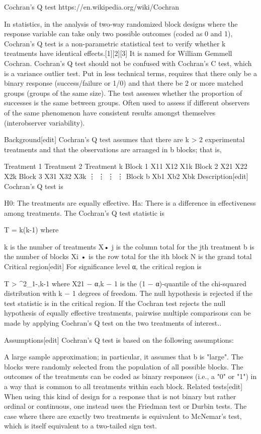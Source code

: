 Cochran's Q test
https://en.wikipedia.org/wiki/Cochran%

In statistics, in the analysis of two-way randomized block designs where the response variable can take only two possible outcomes (coded as 0 and 1), Cochran's Q test is a non-parametric statistical test to verify whether k treatments have identical effects.[1][2][3] It is named for William Gemmell Cochran. Cochran's Q test should not be confused with Cochran's C test, which is a variance outlier test. Put in less technical terms, requires that there only be a binary response (success/failure or 1/0) and that there be 2 or more matched groups (groups of the same size). The test assesses whether the proportion of successes is the same between groups. Often used to assess if different observers of the same phenomenon have consistent results amongst themselves (interobserver variability).

Background[edit]
Cochran's Q test assumes that there are k > 2 experimental treatments and that the observations are arranged in b blocks; that is,

Treatment 1	Treatment 2	\cdots	Treatment k
Block 1	X11	X12	\cdots	X1k
Block 2	X21	X22	\cdots	X2k
Block 3	X31	X32	\cdots	X3k
\vdots
\vdots
\vdots
\ddots
\vdots
Block b	Xb1	Xb2	\cdots	Xbk
Description[edit]
Cochran's Q test is

H0: The treatments are equally effective.
Ha: There is a difference in effectiveness among treatments.
The Cochran's Q test statistic is


T = k\left(k-1\right)
where

k is the number of treatments
X• j is the column total for the jth treatment
b is the number of blocks
Xi • is the row total for the ith block
N is the grand total
Critical region[edit]
For significance level α, the critical region is


T > \chi^2_{1-\alpha,k-1}
where Χ21 − α,k − 1 is the (1 − α)-quantile of the chi-squared distribution with k − 1 degrees of freedom. The null hypothesis is rejected if the test statistic is in the critical region. If the Cochran test rejects the null hypothesis of equally effective treatments, pairwise multiple comparisons can be made by applying Cochran's Q test on the two treatments of interest..

Assumptions[edit]
Cochran's Q test is based on the following assumptions:

A large sample approximation; in particular, it assumes that b is "large".
The blocks were randomly selected from the population of all possible blocks.
The outcomes of the treatments can be coded as binary responses (i.e., a "0" or "1") in a way that is common to all treatments within each block.
Related tests[edit]
When using this kind of design for a response that is not binary but rather ordinal or continuous, one instead uses the Friedman test or Durbin tests.
The case where there are exactly two treatments is equivalent to McNemar's test, which is itself equivalent to a two-tailed sign test.
